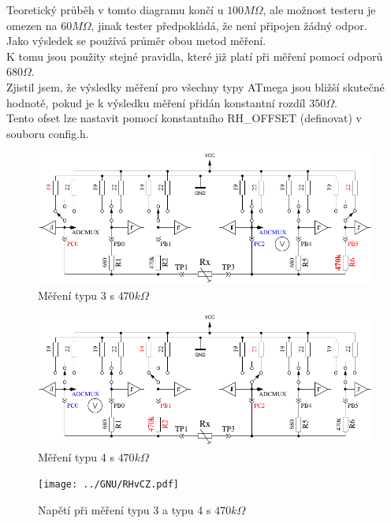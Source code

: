 Teoretický průběh v tomto diagramu končí u \(100M\Omega\), ale možnost testeru je omezen na \(60M\Omega\), jinak tester předpokládá, že není připojen žádný odpor.\\
Jako výsledek se používá průměr obou metod měření.\\ K tomu jsou použity stejné pravidla, které již platí při měření pomocí odporů \(680\Omega\).\\
Zjistil jsem, že výsledky měření pro všechny typy ATmega jsou bližší skutečné hodnotě, pokud je k výsledku měření přidán konstantní rozdíl  \(350\Omega\).\\
Tento ofset lze nastavit pomocí konstantního RH\_OFFSET (definovat) v souboru config.h.

\begin{figure}[H]
\centering
\includegraphics[]{../FIG/ResistormessH1.pdf}
\caption{Měření typu 3 s \(470k\Omega\) }
\label{fig:RH1mes}
\end{figure}

\begin{figure}[H]
 \centering
 \includegraphics[]{../FIG/ResistormessH2.pdf}
 \caption{Měření typu 4 s \(470k\Omega\) }
\label{fig:RH2mes}
\end{figure}

\begin{figure}[H]
\centering
 \texttt{[image: ../GNU/RHvCZ.pdf]}
\caption{Napětí při měření typu 3 a typu 4 s \(470k\Omega\) }
\label{fig:RHv}
\end{figure}

